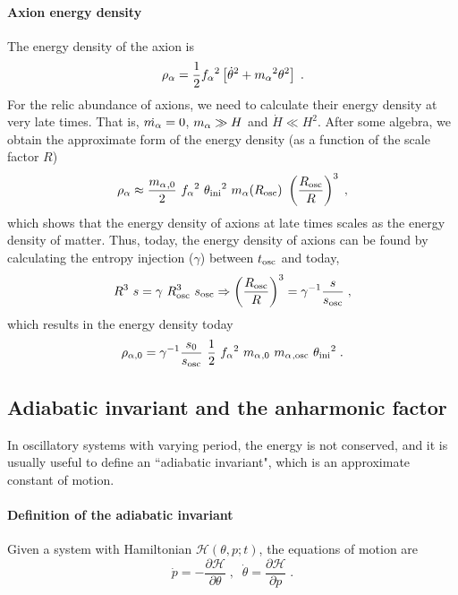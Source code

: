 \documentclass[11pt,a4paper]{article}
\begin{document}
\paragraph{Axion energy density}
%
The energy density of the axion is 
%
\begin{eqnarray}
	\rho _\alpha = \dfrac{1}{2} f_{\alpha}{}^2 \left[  \dot{\theta}^2 + m_\alpha{}^2 \theta^2  \right] \;.
	\label{eq:rho_a_def} 
\end{eqnarray}
%
For the relic abundance of axions, we need to calculate their energy density at very late times. That is, $\dot {m_\alpha{}} = 0$, $m_\alpha{} \gg H$ and $\dot H \ll H^2$. After some algebra, we obtain the approximate form of the energy density (as a function of the scale factor $R$) 
%
\begin{eqnarray}
	\rho _\alpha \approx \dfrac{\ma_{,0} }{2}  \ \fa^2 \ \thetai^2  \ \ma(R_{\rm osc}) \ \lrb{\dfrac{R_{\rm osc}}{R}}^3 \;,
	\label{eq:rho_a0} 
\end{eqnarray}
%
which shows that the energy density of axions at late times scales as the energy density of matter. Thus, today, the energy density of axions can be found by calculating the entropy injection ($\gamma$) between $t_{\rm osc}{}$ and today, \ie
%
\begin{equation}
	R^3 \ s = \gamma \ R_{\rm osc}^3 \ s_{\rm osc} \Rightarrow  \left( \dfrac{R_{\rm osc}}{R} \right)^3 = \gamma^{-1} \dfrac{s}{s_{\rm osc}} \;,
\end{equation}
%
which results in the energy density today
\begin{eqnarray}
	\rho _{\alpha,0} = \gamma^{-1}  \dfrac{s_0}{s_{\rm osc}} \  \dfrac{1 }{2}  \ f_{\alpha}{}^2 \ m_\alpha{}_{,0} \ m_\alpha{}_{,{\rm osc}} \ \theta_{\rm ini}{}^2    \;.
	\label{eq:rho_a_approx} 
\end{eqnarray}
%

\subsection{Adiabatic invariant and the anharmonic factor}\label{sec:an_fac}
%
In oscillatory systems with varying period, the energy is not conserved, and it is usually useful to define an ``adiabatic invariant", which is an approximate constant of motion.

\paragraph{Definition of the adiabatic invariant}
%
Given a system with Hamiltonian $\mathcal{H}(\theta,p;t)$, the equations of motion are 
%
\begin{equation}
	\dot p = - \dfrac{\partial \mathcal{H}}{\partial \theta} \;, \;\; 
	\dot \theta =  \dfrac{\partial \mathcal{H}}{\partial p} \;.
	\label{eq:hamiltonian_eoms}
\end{equation}
\end{document}
